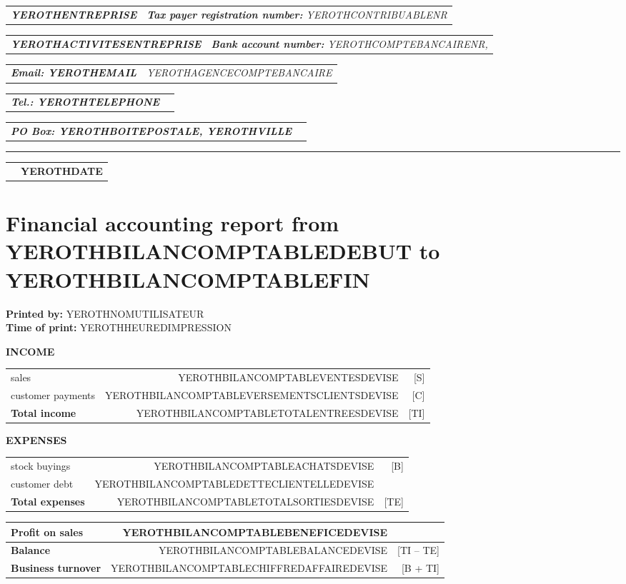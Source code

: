\documentclass[11pt,YEROTHPAPERSPEC,landscape]{article} %
\makeatletter
\newcommand{\headerrow}[2]
{\begin{tabular*}{\linewidth}{l@{\extracolsep{\fill}}r}
	#1 &
	#2 \\
\end{tabular*}}
\newcommand{\emphbold}[1]{\textbf{\emph{#1}}\xspace}
\makeatother
\begin{document}
\bigskip

\headerrow
	{\emphbold{YEROTHENTREPRISE}}
	{\emph{\textbf{Tax payer registration number:} YEROTHCONTRIBUABLENR}}
\headerrow
	{\emphbold{YEROTHACTIVITESENTREPRISE}}
	{\emph{\textbf{Bank account number:} YEROTHCOMPTEBANCAIRENR,}}
\headerrow
	{\emphbold{Email: YEROTHEMAIL}}
	{\emph{YEROTHAGENCECOMPTEBANCAIRE}}
\headerrow
	{\emphbold{Tel.: YEROTHTELEPHONE}}
	{}
\headerrow
	{\emphbold{PO Box: YEROTHBOITEPOSTALE, YEROTHVILLE}}
	{}
	
\hrule

\headerrow
	{}
	{\textbf{YEROTHDATE}}

\section*{Financial accounting report from YEROTHBILANCOMPTABLEDEBUT to YEROTHBILANCOMPTABLEFIN}

\textbf{Printed by:} YEROTHNOMUTILISATEUR\\
\textbf{Time of print:} YEROTHHEUREDIMPRESSION\\

\vspace{0.3cm}

\vspace{1cm}
\textbf{INCOME}
\begin{table}[!htbp]
\begin{tabular}{lrr}
sales  				&  YEROTHBILANCOMPTABLEVENTESDEVISE  			& [S]\\ 
customer payments  	&  YEROTHBILANCOMPTABLEVERSEMENTSCLIENTSDEVISE  & [C]\\ \hline
\textbf{Total income}  		&  YEROTHBILANCOMPTABLETOTALENTREESDEVISE & [TI] \\	 
\end{tabular}
\end{table}


\vspace{1cm}
\textbf{EXPENSES}
\begin{table}[!htbp]
\begin{tabular}{lrr}
stock buyings  	&  YEROTHBILANCOMPTABLEACHATSDEVISE  			& [B]\\ 
customer debt  		&  YEROTHBILANCOMPTABLEDETTECLIENTELLEDEVISE &  	\\ \hline
\textbf{Total expenses}  		&  YEROTHBILANCOMPTABLETOTALSORTIESDEVISE & [TE] \\
\end{tabular}
\end{table}


\vspace{1cm}

\begin{table}[!htbp]
\centering
\begin{tabular}{lrr}
\textbf{Profit on sales}  &  YEROTHBILANCOMPTABLEBENEFICEDEVISE &  \\ \hline
\textbf{Balance}  			&  YEROTHBILANCOMPTABLEBALANCEDEVISE  & [TI -- TE]\\ \hline
\textbf{Business turnover}  &  YEROTHBILANCOMPTABLECHIFFREDAFFAIREDEVISE  & [B + TI]\\ 
\end{tabular}
\end{table}
\end{document}
